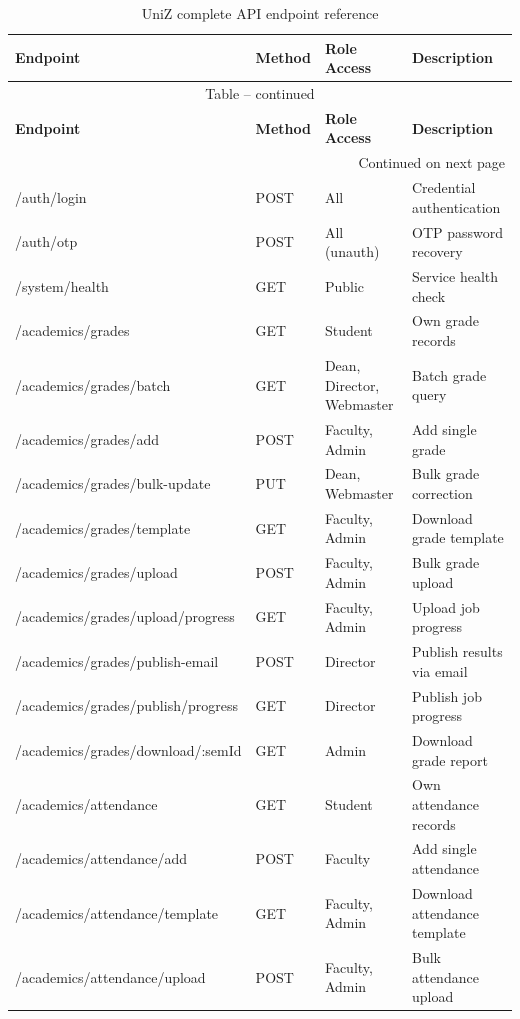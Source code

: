 \documentclass[12pt,a4paper]{report}
\begin{document}
\begin{longtable}{p{4.3cm}p{1.6cm}p{3.2cm}p{3.5cm}}
\caption{UniZ complete API endpoint reference}\label{tab:apiref}\\
\toprule
\textbf{Endpoint} & \textbf{Method} & \textbf{Role Access} & \textbf{Description} \\
\midrule
\endfirsthead
\multicolumn{4}{c}{Table \thetable{} -- continued}\\
\toprule
\textbf{Endpoint} & \textbf{Method} & \textbf{Role Access} & \textbf{Description} \\
\midrule
\endhead
\midrule\multicolumn{4}{r}{Continued on next page}\\
\endfoot
\bottomrule
\endlastfoot
/auth/login & POST & All & Credential authentication \\
/auth/otp & POST & All (unauth) & OTP password recovery \\
/system/health & GET & Public & Service health check \\
/academics/grades & GET & Student & Own grade records \\
/academics/grades/batch & GET & Dean, Director, Webmaster & Batch grade query \\
/academics/grades/add & POST & Faculty, Admin & Add single grade \\
/academics/grades/bulk-update & PUT & Dean, Webmaster & Bulk grade correction \\
/academics/grades/template & GET & Faculty, Admin & Download grade template \\
/academics/grades/upload & POST & Faculty, Admin & Bulk grade upload \\
/academics/grades/upload/progress & GET & Faculty, Admin & Upload job progress \\
/academics/grades/publish-email & POST & Director & Publish results via email \\
/academics/grades/publish/progress & GET & Director & Publish job progress \\
/academics/grades/download/:semId & GET & Admin & Download grade report \\
/academics/attendance & GET & Student & Own attendance records \\
/academics/attendance/add & POST & Faculty & Add single attendance \\
/academics/attendance/template & GET & Faculty, Admin & Download attendance template \\
/academics/attendance/upload & POST & Faculty, Admin & Bulk attendance upload \\

\end{longtable}
\end{document}
